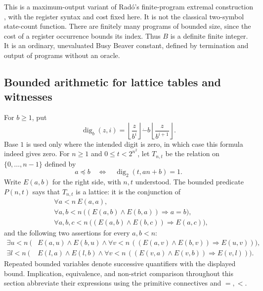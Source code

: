 This is a maximum-output variant of Rad\'o's finite-program extremal
construction \citep{Rado1962}, with the register syntax and cost fixed
here.  It is not the classical two-symbol state-count function.
There are finitely many programs of bounded size, since the cost of a
register occurrence bounds its index.  Thus $B$ is a definite finite
integer.  It is an ordinary, unevaluated Busy Beaver constant, defined
by termination and output of programs without an oracle.

\subsection{Bounded arithmetic for lattice tables and witnesses}

\begin{definition}\label{q:table-predicate}
For $b\ge1$, put
\begin{equation}\label{q:digit}
 \operatorname{dig}_b(z,i)=
   \left\lfloor\frac{z}{b^i}\right\rfloor
       \mathbin{\dot-}
       b\left\lfloor\frac{z}{b^{i+1}}\right\rfloor.
\end{equation}
Base $1$ is used only where the intended digit is zero, in which case
this formula indeed gives zero.  For $n\ge1$ and $0\le t<2^{n^2}$,
let $T_{n,t}$ be the relation on $\{0,\ldots,n-1\}$ defined by
\begin{equation}\label{q:order-bit}
          a\preceq b\quad\Longleftrightarrow\quad
                         \operatorname{dig}_2(t,an+b)=1.
\end{equation}
Write $E(a,b)$ for the right side, with $n,t$ understood.  The bounded
predicate $P(n,t)$ says that $T_{n,t}$ is a lattice: it is the conjunction
of
\begin{align*}
 &\forall a<n\ E(a,a),\\
 &\forall a,b<n\ \bigl((E(a,b)\land E(b,a))\Longrightarrow a=b\bigr),\\
 &\forall a,b,c<n\ \bigl((E(a,b)\land E(b,c))\Longrightarrow E(a,c)\bigr),
\end{align*}
and the following two assertions for every $a,b<n$:
\begin{align*}
 \exists u<n\ \bigl(&E(a,u)\land E(b,u)\land
   \forall v<n\,((E(a,v)\land E(b,v))\Longrightarrow E(u,v))\bigr),\\
 \exists l<n\ \bigl(&E(l,a)\land E(l,b)\land
   \forall v<n\,((E(v,a)\land E(v,b))\Longrightarrow E(v,l))\bigr).
\end{align*}
Repeated bounded variables denote successive quantifiers with the
displayed bound.  Implication, equivalence, and non-strict comparison
throughout this section abbreviate their expressions using the
primitive connectives and $=,<$.
\end{definition}

